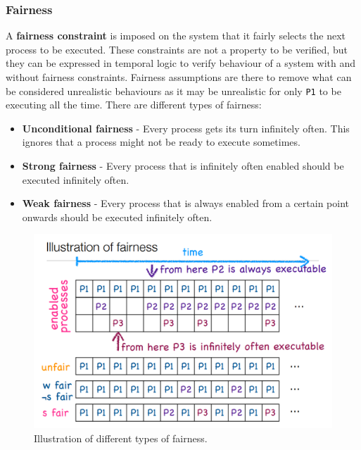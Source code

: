 \documentclass[11pt]{article}
\begin{document}
\subsubsection{Fairness}
A \textbf{fairness constraint} is imposed on the system that it fairly selects the next process to be executed. These constraints are not a property to be verified, but they can be expressed in temporal logic to verify behaviour of a system with and without fairness constraints. Fairness assumptions are there to remove what can be considered unrealistic behaviours as it may be unrealistic for only \texttt{P1} to be executing all the time.
\n
There are different types of fairness:
\begin{itemize}
\item \textbf{Unconditional fairness} - Every process gets its turn infinitely often. This ignores that a process might not be ready to execute sometimes.
\item \textbf{Strong fairness} - Every process that is infinitely often enabled should be executed infinitely often.
\item \textbf{Weak fairness} - Every process that is always enabled from a certain point onwards should be executed infinitely often. 
\end{itemize}

\begin{figure}[H]
\centering
\includegraphics[width=1\textwidth, keepaspectratio]{imgs/fairness-example.png}
\caption{Illustration of different types of fairness.}

\end{figure}
\end{document}
